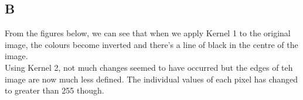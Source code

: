 \documentclass[11pt]{article} %
\begin{document}
\subsection{B}
From the figures below, we can see that when we apply Kernel 1 to the original image, the colours become inverted and there's a line of black in the centre of the image. \\ Using Kernel 2, not much changes seemed to have occurred but the edges of teh image are now much less defined. The individual values of each pixel has changed to greater than 255 though.
\begin{figure}[h]
\centering
{}
\qquad
{}
\qquad 
{}
\qquad
\end{figure}
\end{document}
